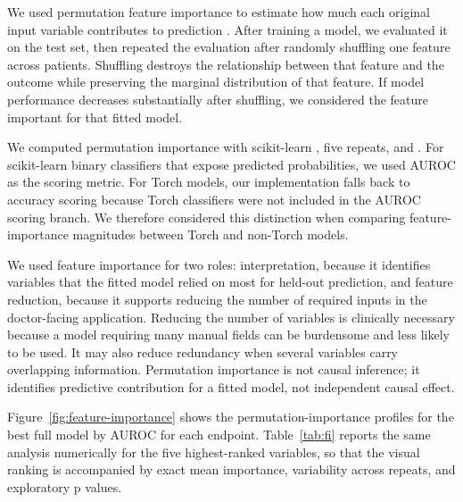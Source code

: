 \documentclass[11pt,a4paper]{article}
\newcommand{\code}[1]{\texttt{\detokenize{#1}}}
\begin{document}
We used permutation feature importance to estimate how much each original input variable contributes to prediction \cite{fisher2019modelreliance}. After training a model, we evaluated it on the test set, then repeated the evaluation after randomly shuffling one feature across patients. Shuffling destroys the relationship between that feature and the outcome while preserving the marginal distribution of that feature. If model performance decreases substantially after shuffling, we considered the feature important for that fitted model.

We computed permutation importance with scikit-learn \code{permutation_importance}, five repeats, and \code{random_state=42}. For scikit-learn binary classifiers that expose predicted probabilities, we used AUROC as the scoring metric. For Torch models, our implementation falls back to accuracy scoring because Torch classifiers were not included in the AUROC scoring branch. We therefore considered this distinction when comparing feature-importance magnitudes between Torch and non-Torch models.

We used feature importance for two roles: interpretation, because it identifies variables that the fitted model relied on most for held-out prediction, and feature reduction, because it supports reducing the number of required inputs in the doctor-facing application. Reducing the number of variables is clinically necessary because a model requiring many manual fields can be burdensome and less likely to be used. It may also reduce redundancy when several variables carry overlapping information. Permutation importance is not causal inference; it identifies predictive contribution for a fitted model, not independent causal effect.

Figure~\ref{fig:feature-importance} shows the permutation-importance profiles for the best full model by AUROC for each endpoint. Table~\ref{tab:fi} reports the same analysis numerically for the five highest-ranked variables, so that the visual ranking is accompanied by exact mean importance, variability across repeats, and exploratory p values.
\end{document}
